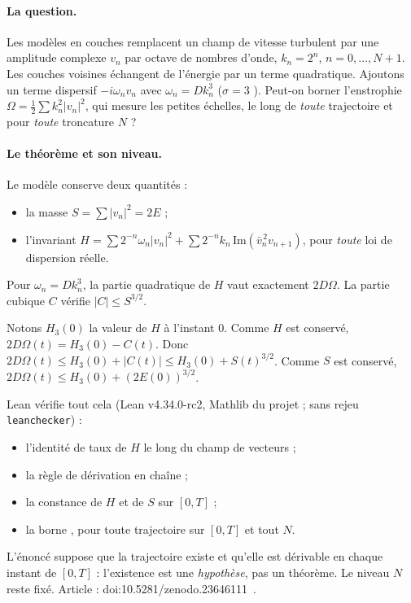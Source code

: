 \paragraph{La question.} Les modèles en couches remplacent un champ de vitesse turbulent par une amplitude complexe
$v_n$ par octave de nombres d'onde, $k_n=2^n$, $n=0,\dots,N+1$. Les couches voisines échangent de l'énergie par un
terme quadratique. Ajoutons un terme dispersif $-i\omega_nv_n$ avec $\omega_n=Dk_n^3$ (\og $\sigma=3$ \fg). Peut-on
borner l'enstrophie $\Omega=\tfrac12\sum k_n^2|v_n|^2$, qui mesure les petites échelles, le long de \emph{toute}
trajectoire et pour \emph{toute} troncature $N$ ?

\paragraph{Le théorème et son niveau.} Le modèle conserve deux quantités :
\begin{itemize}
\item la \og masse \fg{} $S=\sum|v_n|^2=2E$ ;
\item l'invariant $H=\sum2^{-n}\omega_n|v_n|^2+\sum2^{-n}k_n\,\mathrm{Im}(\bar v_n^{\,2}v_{n+1})$, pour \emph{toute}
loi de dispersion réelle.
\end{itemize}
Pour $\omega_n=Dk_n^3$, la partie quadratique de $H$ vaut exactement $2D\Omega$. La partie cubique $C$ vérifie
$|C|\le S^{3/2}$.
\begin{humanproof}
Notons $H_3(0)$ la valeur de $H$ à l'instant $0$. Comme $H$ est conservé, $2D\Omega(t)=H_3(0)-C(t)$. Donc
$2D\Omega(t)\le H_3(0)+|C(t)|\le H_3(0)+S(t)^{3/2}$. Comme $S$ est conservé,
$2D\Omega(t)\le H_3(0)+(2E(0))^{3/2}$.
\end{humanproof}
Lean vérifie tout cela \tierAs{} (Lean v4.34.0-rc2, Mathlib du projet ; sans rejeu \texttt{leanchecker}) :
\begin{itemize}
\item l'identité de taux de $H$ le long du champ de vecteurs ;
\item la règle de dérivation en chaîne ;
\item la constance de $H$ et de $S$ sur $[0,T]$ ;
\item la borne , pour toute trajectoire sur $[0,T]$ et tout $N$.
\end{itemize}
L'énoncé suppose que la trajectoire existe et qu'elle est dérivable en chaque instant de $[0,T]$ : l'existence est
une \emph{hypothèse}, pas un théorème. Le niveau $N$ reste fixé. Article : doi:10.5281/zenodo.23646111~\cite{ch5:sigma3}.

